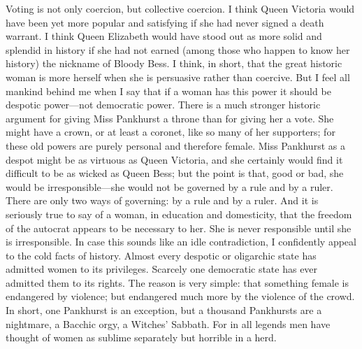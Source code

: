 \documentclass{book}
\begin{document}
Voting is not only coercion, but collective coercion. I think Queen Victoria would have been yet more popular and satisfying if she had never signed a death warrant. I think Queen Elizabeth would have stood out as more solid and splendid in history if she had not earned (among those who happen to know her history) the nickname of Bloody Bess. I think, in short, that the great historic woman is more herself when she is persuasive rather than coercive. But I feel all mankind behind me when I say that if a woman has this power it should be despotic power—not democratic power. There is a much stronger historic argument for giving Miss Pankhurst a throne than for giving her a vote. She might have a crown, or at least a coronet, like so many of her supporters; for these old powers are purely personal and therefore female. Miss Pankhurst as a despot might be as virtuous as Queen Victoria, and she certainly would find it difficult to be as wicked as Queen Bess; but the point is that, good or bad, she would be irresponsible—she would not be governed by a rule and by a ruler. There are only two ways of governing: by a rule and by a ruler. And it is seriously true to say of a woman, in education and domesticity, that the freedom of the autocrat appears to be necessary to her. She is never responsible until she is irresponsible. In case this sounds like an idle contradiction, I confidently appeal to the cold facts of history. Almost every despotic or oligarchic state has admitted women to its privileges. Scarcely one democratic state has ever admitted them to its rights. The reason is very simple: that something female is endangered by violence; but endangered much more by the violence of the crowd. In short, one Pankhurst is an exception, but a thousand Pankhursts are a nightmare, a Bacchic orgy, a Witches’ Sabbath. For in all legends men have thought of women as sublime separately but horrible in a herd.
\end{document}
